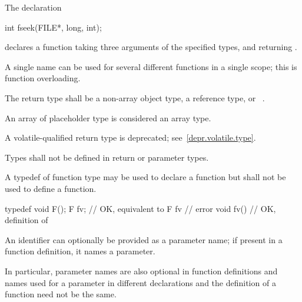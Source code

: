 \pnum
\begin{example}
The declaration
\begin{codeblock}
int fseek(FILE*, long, int);
\end{codeblock}
declares a function taking three arguments of the specified types,
and returning
.
\end{example}

\pnum
{}%
\begin{note}
A single name can be used for several different functions in a single scope;
this is function overloading.
\end{note}

\pnum
{}%
%
The return type shall be a non-array object type, a reference type, or \cv{}~.
\begin{note}
An array of placeholder type is considered an array type.
\end{note}

\pnum
A volatile-qualified return type is deprecated;
see~\ref{depr.volatile.type}.

\pnum
Types shall not be defined in return or parameter types.

\pnum
{}%
A typedef of function type may be used to declare a function but shall not be
used to define a function.
\begin{example}
\begin{codeblock}
typedef void F();
F  fv;              // OK, equivalent to 
F  fv { }           // error
void fv() { }       // OK, definition of 
\end{codeblock}
\end{example}

\pnum
An identifier can optionally be provided as a parameter name;
if present in a function definition, it names a parameter.
\begin{note}
In particular, parameter names are also optional in function definitions
and names used for a parameter in different declarations and the definition
of a function need not be the same.
\end{note}

